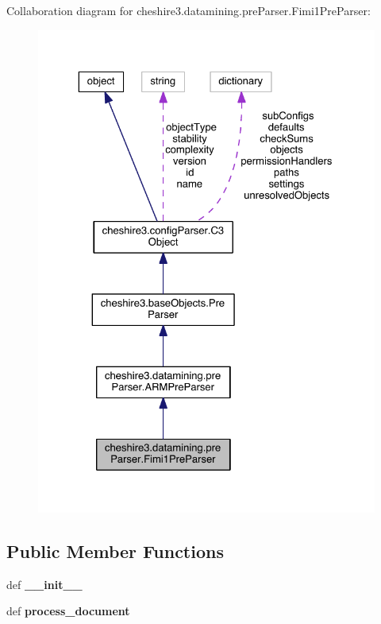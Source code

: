 Collaboration diagram for cheshire3.\-datamining.\-pre\-Parser.\-Fimi1\-Pre\-Parser\-:
\nopagebreak
\begin{figure}[H]
\begin{center}
\leavevmode
\includegraphics[width=325pt]{classcheshire3_1_1datamining_1_1pre_parser_1_1_fimi1_pre_parser__coll__graph}
\end{center}
\end{figure}
\subsection*{Public Member Functions}
\begin{DoxyCompactItemize}
\item 
\hypertarget{classcheshire3_1_1datamining_1_1pre_parser_1_1_fimi1_pre_parser_ad3948f01225cb4fc98a16eb393e02342}{def {\bfseries \-\_\-\-\_\-init\-\_\-\-\_\-}}\label{classcheshire3_1_1datamining_1_1pre_parser_1_1_fimi1_pre_parser_ad3948f01225cb4fc98a16eb393e02342}

\item 
\hypertarget{classcheshire3_1_1datamining_1_1pre_parser_1_1_fimi1_pre_parser_a2ef5de3bbc9aa39adbdd27c045ba6829}{def {\bfseries process\-\_\-document}}\label{classcheshire3_1_1datamining_1_1pre_parser_1_1_fimi1_pre_parser_a2ef5de3bbc9aa39adbdd27c045ba6829}

\end{DoxyCompactItemize}
